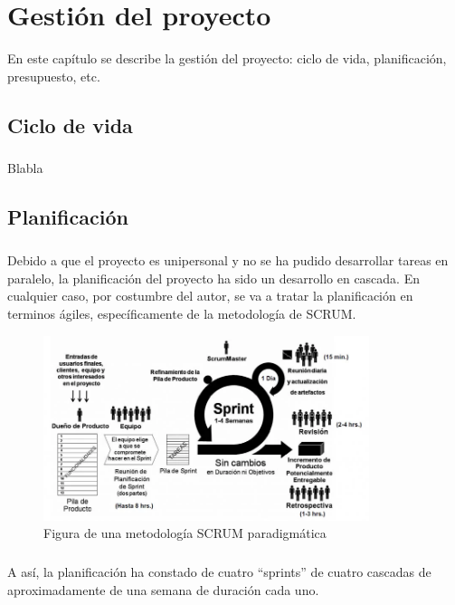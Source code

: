 \chapter{Gestión del proyecto}\label{sec:gestion}

En este capítulo se describe la gestión del proyecto: ciclo de vida, planificación,
presupuesto, etc.

\section{Ciclo de vida}

\paragraph{}Blabla

\section{Planificación}

\paragraph{}Debido a que el proyecto es unipersonal y no se ha pudido desarrollar tareas
en paralelo, la planificación del proyecto ha sido un desarrollo en cascada. En cualquier
caso, por costumbre del autor, se va a tratar la planificación en terminos ágiles,
específicamente de la metodología de SCRUM.

\begin{figure}[H]
    \centering
    \includegraphics[width=0.85\textwidth]{imgs/scrum}
    \caption{Figura de una metodología SCRUM paradigmática}
    \label{fig:scrum}
\end{figure}

\paragraph{}A así, la planificación ha constado de cuatro ``sprints'' de cuatro cascadas
de aproximadamente de una  semana de duración cada uno.

